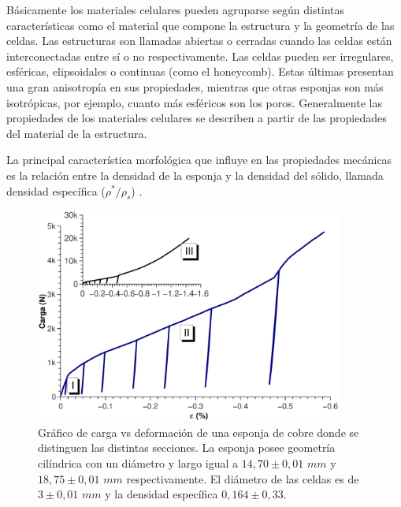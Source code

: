 \documentclass[a4paper,12pt,fleqn,twoside,openany]{book}
\begin{document}
Básicamente los materiales celulares pueden agruparse según distintas características como el material que compone la estructura y la geometría de las 
celdas. Las estructuras son llamadas abiertas o cerradas cuando las celdas están interconectadas entre sí o no respectivamente. Las celdas pueden ser irregulares, esféricas, elipsoidales o continuas (como el honeycomb). Estas últimas presentan una gran anisotropía en sus propiedades, mientras que otras 
esponjas son más isotrópicas, por ejemplo, cuanto más esféricos son los poros. Generalmente las propiedades de los materiales celulares se describen a partir de las 
propiedades del material de la estructura. 

La principal característica morfológica que influye en las propiedades mecánicas es la relación entre la densidad de la esponja y la densidad 
del sólido, llamada densidad específica ($\rho^* / \rho_s$) \cite{cellular}.



\begin{figure}[h]
 \centering
 \includegraphics[width=0.9\textwidth]{Img/Introduccion/EspCu.eps}
 \caption{Gráfico de carga vs deformación de una esponja de cobre donde se distinguen las distintas secciones. La esponja posee geometría cilíndrica con un diámetro y largo igual a $14,70\pm 0,01$ $mm$ y $18,75 \pm 0,01$ $mm$ respectivamente. El diámetro de las celdas es de $3 \pm 0,01$ $mm$ y la densidad específica $0,164\pm 0,33$.}
 \label{fig:EspCu} 
\end{figure}
\end{document}
